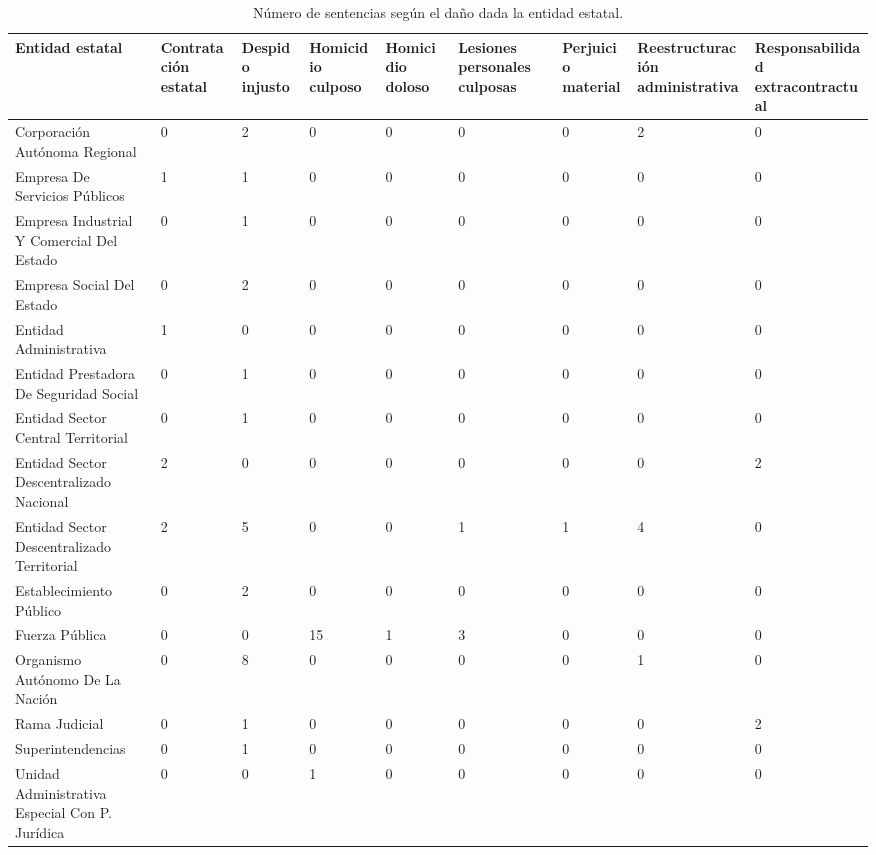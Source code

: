 \begin{sidewaystable}[!htbp]
\centering
\caption{Número de sentencias según el daño dada la entidad estatal.} 
\label{tab:entidaddano}
\begin{tabular}{p{5cm}R{2cm}R{2cm}R{2cm}R{2cm}R{2cm}R{2cm}R{2cm}R{2cm}}
  \hline
Entidad estatal & Contratación estatal & Despido injusto & Homicidio culposo & Homicidio doloso & Lesiones personales culposas & Perjuicio material & Reestructuración administrativa & Responsabilidad extracontractual \\ 
  \hline
Corporación Autónoma Regional &  0 &  2 &  0 &  0 &  0 &  0 &  2 &  0 \\ 
  Empresa De Servicios Públicos &  1 &  1 &  0 &  0 &  0 &  0 &  0 &  0 \\ 
  Empresa Industrial Y Comercial Del Estado &  0 &  1 &  0 &  0 &  0 &  0 &  0 &  0 \\ 
  Empresa Social Del Estado &  0 &  2 &  0 &  0 &  0 &  0 &  0 &  0 \\ 
  Entidad Administrativa &  1 &  0 &  0 &  0 &  0 &  0 &  0 &  0 \\ 
  Entidad Prestadora De Seguridad Social &  0 &  1 &  0 &  0 &  0 &  0 &  0 &  0 \\ 
  Entidad Sector Central Territorial &  0 &  1 &  0 &  0 &  0 &  0 &  0 &  0 \\ 
  Entidad Sector Descentralizado Nacional &  2 &  0 &  0 &  0 &  0 &  0 &  0 &  2 \\ 
  Entidad Sector Descentralizado Territorial &  2 &  5 &  0 &  0 &  1 &  1 &  4 &  0 \\ 
  Establecimiento Público &  0 &  2 &  0 &  0 &  0 &  0 &  0 &  0 \\ 
  Fuerza Pública &  0 &  0 & 15 &  1 &  3 &  0 &  0 &  0 \\ 
  Organismo Autónomo De La Nación &  0 &  8 &  0 &  0 &  0 &  0 &  1 &  0 \\ 
  Rama Judicial &  0 &  1 &  0 &  0 &  0 &  0 &  0 &  2 \\ 
  Superintendencias &  0 &  1 &  0 &  0 &  0 &  0 &  0 &  0 \\ 
  Unidad Administrativa Especial Con P. Jurídica &  0 &  0 &  1 &  0 &  0 &  0 &  0 &  0 \\ 
   \hline
\end{tabular}
\end{sidewaystable}
